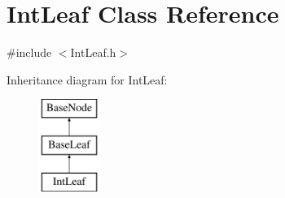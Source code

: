 \hypertarget{class_int_leaf}{\section{Int\-Leaf Class Reference}
\label{class_int_leaf}
}


{\ttfamily \#include $<$Int\-Leaf.\-h$>$}

Inheritance diagram for Int\-Leaf\-:\begin{figure}[H]
\begin{center}
\leavevmode
\includegraphics[height=3.000000cm]{class_int_leaf}
\end{center}
\end{figure}
